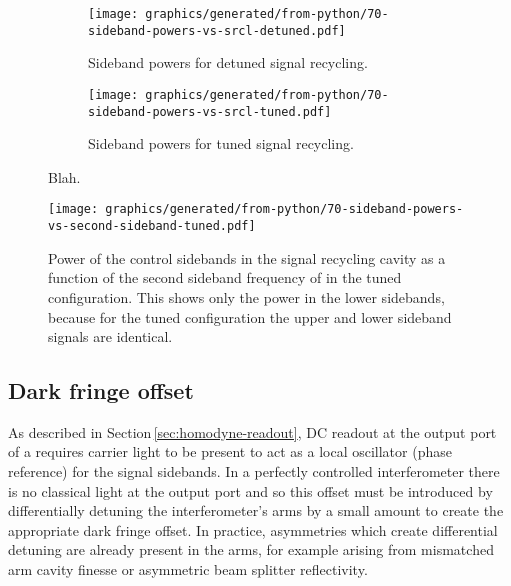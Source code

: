 \begin{figure}
  \centering
  \begin{subfigure}{.49\textwidth}
    \texttt{[image: graphics/generated/from-python/70-sideband-powers-vs-srcl-detuned.pdf]}
    \caption[Power of the control sidebands in the signal recycling cavity as a function of length of \ETLF{} in the detuned configuration]{\label{fig:sideband-powers-srcl-detuned}Sideband powers for detuned signal recycling.}
  \end{subfigure}
  \hfill
  \begin{subfigure}{.49\textwidth}
    \texttt{[image: graphics/generated/from-python/70-sideband-powers-vs-srcl-tuned.pdf]}
    \caption[Power of the control sidebands in the signal recycling cavity as a function of length of \ETLF{} in the tuned configuration]{\label{fig:sideband-powers-srcl-tuned}Sideband powers for tuned signal recycling.}
  \end{subfigure}
  \caption[Power of the control sidebands in the signal recycling cavity as a function of length of \ETLF{}]{\label{fig:sideband-powers-srcl}Blah.}
\end{figure}

\begin{figure}
  \centering
  \texttt{[image: graphics/generated/from-python/70-sideband-powers-vs-second-sideband-tuned.pdf]}
  \caption[Power of the control sidebands in the signal recycling cavity as a function of the second sideband frequency of \ETLF{} in the tuned configuration]{\label{fig:sideband-powers-vs-f2-tuned}Power of the control sidebands in the signal recycling cavity as a function of the second sideband frequency of \ETLF{} in the tuned configuration. This shows only the power in the lower sidebands, because for the tuned configuration the upper and lower sideband signals are identical.}
\end{figure}

\subsection{Dark fringe offset}
As described in Section\,\ref{sec:homodyne-readout}, \gls{DC} readout at the output port of a \DRFPMI{} requires carrier light to be present to act as a local oscillator (phase reference) for the signal sidebands. In a perfectly controlled interferometer there is no classical light at the output port and so this offset must be introduced by differentially detuning the interferometer's arms by a small amount to create the appropriate dark fringe offset. In practice, asymmetries which create differential detuning are already present in the arms, for example arising from mismatched arm cavity finesse or asymmetric beam splitter reflectivity.

